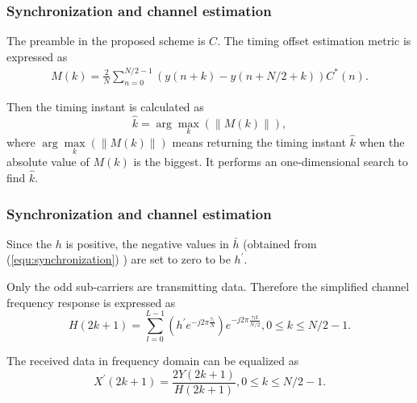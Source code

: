 \documentclass[8 pt]{beamer} %
\begin{document}
\begin{frame}
\frametitle{Synchronization and channel estimation}
The preamble in the proposed scheme is $C$. 
The timing offset estimation metric is expressed as
    \begin{eqnarray}\label{equ:synchronization}
          M(k)=\frac{2}{N}\sum_{n=0}^{N/2-1}(y(n+k)-y(n+N/2+k))C^*(n).
    \end{eqnarray}

Then the timing instant is calculated as
    \begin{equation}\label{equ:d}
            \hat k=\arg\max\limits_{k}(\|M(k)\|),
    \end{equation}
    where $\arg\max\limits_{k}(\|M(k)\|)$ means returning the timing instant $\hat k$ when the absolute value of $M(k)$ is the biggest. It performs an one-dimensional search to find $\hat k$.
   
\end{frame}

\begin{frame}
\frametitle{Synchronization and channel estimation}
Since the $ h $ is positive, the negative values in $ \bar{h} $ (obtained from (\ref{equ:synchronization}) ) are set to zero to be $ h^{'} $.

Only the odd sub-carriers are transmitting data. Therefore the simplified channel frequency response is expressed as
    \begin{equation}\label{equ:Channel_Fre_sim}
          H(2k+1)=\sum_{l=0}^{L-1}(h^{'}e^{-j2\pi\frac{\tau_l}{N}})e^{-j2\pi\frac{\tau_l k}{N/2}},0\leq k\leq N/2-1.
    \end{equation}

The received data in frequency domain can be equalized as
    \begin{equation}\label{equ:equalizer}
       X^{'}(2k+1)=\dfrac{2Y(2k+1)}{H(2k+1)},0\leq k\leq N/2-1.
    \end{equation}
   
\end{frame}
\end{document}
